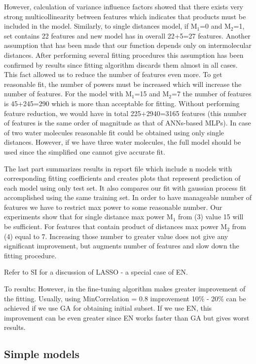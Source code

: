 \documentclass[aps,prl,reprint,amsmath,amssymb,nature]{revtex4-1}
\begin{document}
However, calculation of variance influence factors showed that there 
exists very strong multicollinearity between features which indicates 
that products must be included in the model. Similarly, to single 
distances model, if M$_{1}$=0 and M$_{2}$=1, set contains 22 
features and new model has in overall 22+5=27 features. Another 
assumption that has been made that our function depends only on 
intermolecular distances. After performing several fitting procedures 
this assumption has been confirmed by results since fitting algorithm 
discards them almost in all cases. This fact allowed us to reduce the 
number of features even more. To get reasonable fit, the number of 
powers must be increased which will increase the number of features. For 
the model with M$_{1}$=15 and M$_{2}$=7 the number of features 
is 45+245=290 which is more than acceptable for fitting. Without 
performing feature reduction, we would have in total 225+2940=3165 
features (this number of features is the same order of magnitude as that 
of ANNs-based MLPs). In case of two water molecules reasonable fit could 
be obtained using only single distances. However, if we have three water 
molecules, the full model should be used since the simplified one cannot 
give accurate fit. 

The last part summarizes results in report file which include n models 
with corresponding fitting coefficients and creates plots that represent 
prediction of each model using only test set. It also compares our fit 
with gaussian process fit accomplished using the same training set. In 
order to have manageable number of features we have to restrict max 
power to some reasonable number. Our experiments show that for single 
distance max power M$_{1}$ from (3) value 15 will be sufficient. For 
features that contain product of distances max power M$_{2}$ from (4) 
equal to 7. Increasing those number to greater value does not give any 
significant improvement, but augments number of features and slow down 
the fitting procedure.

Refer to SI for a discussion of LASSO - a special case of EN.

To results: However, in the fine-tuning algorithm makes greater 
improvement of the fitting. Usually, using MinCorrelation = 0.8 
improvement 10\% - 20\% can be achieved if we use GA for obtaining 
initial subset. If we use EN, this improvement can be even greater since 
EN works faster than GA but gives worst results.

\subsection{Simple models}
\end{document}
